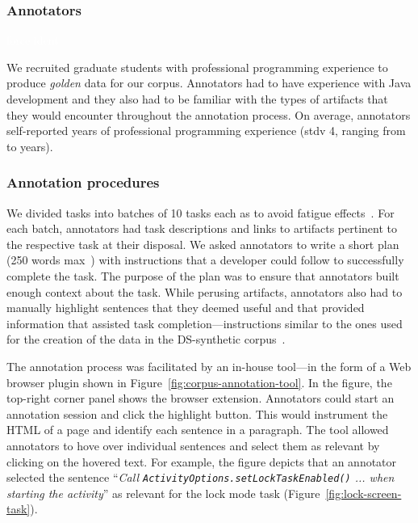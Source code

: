\subsubsection{Annotators}
\textcolor{white}{force ident} %

We recruited  graduate students with professional programming experience to produce \textit{golden} data for our corpus. Annotators had to have experience with Java development and they also had to be familiar with the types of artifacts that they would encounter throughout the annotation process. 
On average, annotators self-reported  years of professional
programming experience (stdv 4, ranging from  to  years).



\subsubsection{Annotation procedures}



We divided tasks into batches of 10 tasks each as to avoid fatigue effects~\cite{Ponzanelli2017}. For each batch, annotators had task descriptions and links to artifacts pertinent to the respective task at their disposal. We asked annotators to write a short plan (250 words max~\cite{Rastkar2010}) with instructions that a developer could follow to successfully complete the task. 
The purpose of the plan was to ensure that annotators built enough context about the task.
While perusing artifacts, annotators also had to manually highlight sentences that they deemed useful and that provided information that assisted task completion---instructions similar to the ones used for the creation of the 
 data in the \acs{DS-synthetic} corpus~\cite{marques2020}.


The annotation process was facilitated by an in-house tool---in the form of a Web browser plugin shown in Figure~\ref{fig:corpus-annotation-tool}. In the figure, the top-right corner panel shows the browser extension. Annotators could start an annotation session and click the highlight button.
This would instrument the HTML of a page and identify each sentence in a paragraph. The tool allowed annotators to hove over individual sentences and select them as relevant by clicking on the hovered text. For example, the figure depicts that an annotator selected  the sentence
``\textit{Call {\small \texttt{ActivityOptions.setLockTaskEnabled()}} ... when starting the activity}'' as relevant for the lock mode task (Figure~\ref{fig:lock-screen-task}).







